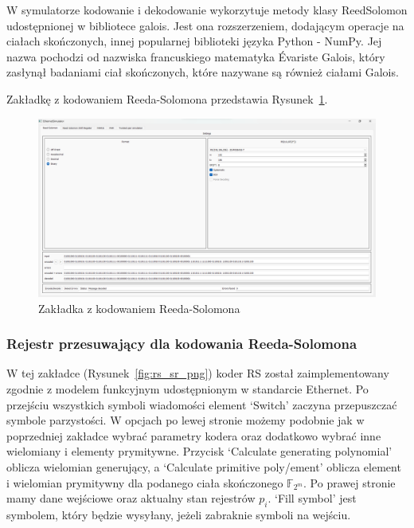 W symulatorze kodowanie i dekodowanie wykorzytuje metody klasy ReedSolomon udostępnionej w bibliotece galois. Jest ona rozszerzeniem, dodającym operacje na ciałach skończonych, innej popularnej biblioteki języka Python - NumPy. Jej nazwa pochodzi od nazwiska francuskiego matematyka Évariste Galois, który zasłynął badaniami ciał skończonych, które nazywane są również ciałami Galois.

Zakładkę z kodowaniem Reeda-Solomona przedstawia Rysunek~\ref{fig:rs_png}.

\begin{figure}[H]
    \centering
    \includegraphics[width=\textwidth]{images/rs.png}
    \caption{Zakładka z kodowaniem Reeda-Solomona}
    \label{fig:rs_png}
\end{figure}

\subsubsection{Rejestr przesuwający dla kodowania Reeda-Solomona}

W tej zakładce (Rysunek~\ref{fig:rs_sr_png}) koder RS został zaimplementowany zgodnie z modelem
funkcyjnym udostępnionym w standarcie Ethernet. Po przejściu
wszystkich symboli wiadomości element `Switch' zaczyna przepuszczać symbole parzystości.
W opcjach po lewej stronie możemy podobnie jak w poprzedniej zakładce wybrać
parametry kodera oraz dodatkowo wybrać inne wielomiany i elementy prymitywne. Przycisk `Calculate generating polynomial' oblicza
wielomian generujący, a `Calculate primitive poly/ement' oblicza element i wielomian prymitywny dla podanego ciała skończonego $\mathbb{F}_{2^m}$.
Po prawej stronie mamy dane wejściowe oraz aktualny stan rejestrów $p_i$. `Fill symbol' jest symbolem, który będzie wysyłany, jeżeli zabraknie symboli na wejściu.

